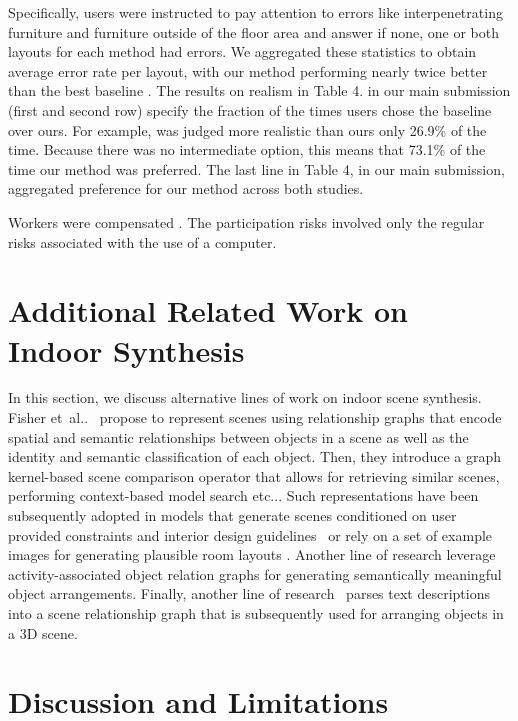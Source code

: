 \documentclass{article}
\makeatletter
\DeclareRobustCommand\onedot{\futurelet\@let@token\@onedot}
\def\@onedot{\ifx\@let@token.\else.\null\fi\xspace}
\def\etc{etc\onedot}
\def\etal{et~al\onedot}
\makeatother
\begin{document}
Specifically,
users were instructed to pay attention to errors like interpenetrating
furniture and furniture outside of the floor area and answer if none, one or
both layouts for each method had errors. We aggregated these statistics to
obtain average error rate per layout, with our method performing nearly twice
better than the best baseline \cite{Ritchie2019CVPR}. The results on realism in Table 4.
in our main submission (first and second row) specify the fraction of the times users chose the
baseline over ours. For example, \cite{Ritchie2019CVPR} was judged more
realistic than ours only 26.9\% of the time. Because there was no intermediate
option, this means that 73.1\% of the time our method was preferred. The last
line in Table 4, in our main submission, aggregated preference for our method
across both studies.

Workers were compensated . The
participation risks involved only the regular risks associated with the use of
a computer.



\section{Additional Related Work on Indoor Synthesis}

In this section, we discuss alternative lines of work on indoor scene
synthesis. Fisher \etal~\cite{Fisher2011SIGGRAPH} propose to represent scenes
using relationship graphs that encode spatial and semantic relationships between
objects in a scene as well as the identity and semantic classification of each
object. Then, they introduce a graph kernel-based scene comparison operator
that allows for retrieving similar scenes, performing context-based model
search \etc. Such representations have been subsequently adopted in models that generate
scenes conditioned on user provided constraints and interior design
guidelines~\cite{Merrell2011SIGGRAPH} or rely on a set of example images 
for generating plausible room layouts \cite{Fisher2012SIGGRAPHASIA}. Another line of research
\cite{Fisher2015SIGGRPAPH, Fu2017SIGGRAPH} leverage activity-associated object
relation graphs for generating semantically meaningful object arrangements.
Finally, another line of research~\cite{Chang2014EMNLP, Ma2018SIGGRAPH} parses
text descriptions into a scene relationship graph that is subsequently used for
arranging objects in a 3D scene.


\section{Discussion and Limitations}
\end{document}
